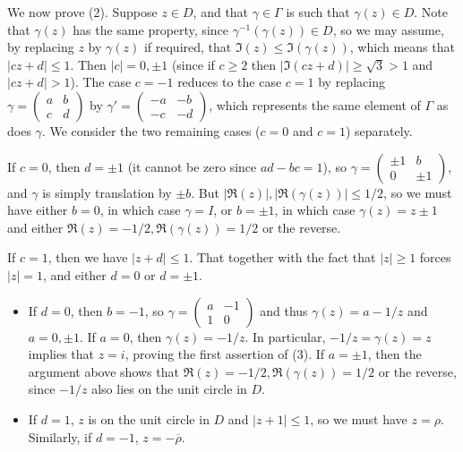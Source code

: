 \documentclass[12pt]{article}
\begin{document}
We now prove (2). Suppose $z\in D$, and that $\gamma\in \Gamma$ is such that $\gamma(z)\in D$. Note that $\gamma(z)$ has the same property, since $\gamma^{-1}(\gamma(z))\in D$, so we may assume, by replacing $z$ by $\gamma(z)$ if required, that $\Im(z)\leq \Im(\gamma(z))$, which means that $\lvert cz+d\rvert\leq 1$. Then $\lvert c\rvert=0, \pm 1$ (since if $c\geq 2$ then $\lvert\Im(cz+d)\rvert\geq \sqrt{3}>1$ and $\lvert cz+d\rvert> 1$). The case $c=-1$ reduces to the case $c=1$ by replacing $\gamma=\begin{pmatrix}a&b\\c&d\end{pmatrix}$ by $\gamma'=\begin{pmatrix}-a&-b\\-c&-d\end{pmatrix}$, which represents the same element of $\Gamma$ as does $\gamma$. We consider the two remaining cases ($c=0$ and $c=1$) separately.

If $c=0$, then $d=\pm 1$ (it cannot be zero since $ad-bc=1$), so $\gamma=\begin{pmatrix} \pm 1 & b\\0 & \pm 1\end{pmatrix}$, and $\gamma$ is simply translation by $\pm b$. But $\lvert\Re(z)\rvert,\lvert\Re(\gamma(z))\rvert\leq 1/2$, so we must have either $b=0$, in which case $\gamma=I$, or $b=\pm 1$, in which case $\gamma(z)=z\pm 1$ and either $\Re(z)=-1/2, \Re(\gamma(z))=1/2$ or the reverse.

If $c=1$, then we have $\lvert z+d\rvert\leq 1$. That together with the fact that $\lvert z\rvert\geq 1$ forces $\lvert z\rvert=1$, and either $d=0$ or $d=\pm 1$.
\begin{itemize} 
\item If $d=0$, then $b=-1$, so $\gamma=\begin{pmatrix}a & -1\\1 & 0\end{pmatrix}$ and thus $\gamma(z)=a-1/z$ and $a=0, \pm 1$. If $a=0$, then $\gamma(z)=-1/z$. In particular, $-1/z=\gamma(z)=z$ implies that $z=i$, proving the first assertion of (3). If $a=\pm 1$, then the argument above shows that $\Re(z)=-1/2, \Re(\gamma(z))=1/2$ or the reverse, since $-1/z$ also lies on the unit circle in $D$.
\item If $d=1$,  $z$ is on the unit circle in $D$ and $\lvert z+1\rvert\leq 1$, so we must have $z=\rho$. Similarly, if $d=-1$, $z=-\overline{\rho}$.
\end{itemize}
\end{document}
